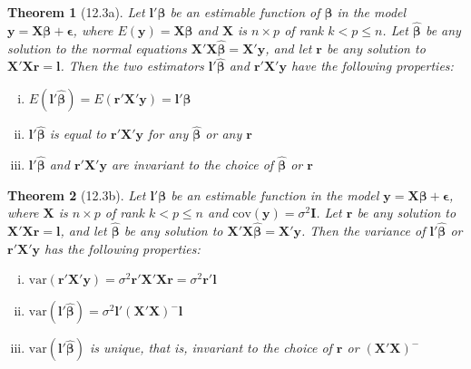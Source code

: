 \documentclass{article}
\newtheorem{theorem}{Theorem}[section]
\begin{document}
\begin{theorem}[12.3a]
Let $\mathbf{l}'\boldsymbol{\beta}$ be an estimable function of $\boldsymbol{\beta}$ in the model $\mathbf{y} = \mathbf{X}\boldsymbol{\beta} + \boldsymbol{\epsilon}$, where $E(\mathbf{y}) = \mathbf{X}\boldsymbol{\beta}$ and $\mathbf{X}$ is $n \times p$ of rank $k < p \leq n$. Let $\hat{\boldsymbol{\beta}}$ be any solution to the normal equations $\mathbf{X}'\mathbf{X}\hat{\boldsymbol{\beta}} = \mathbf{X}'\mathbf{y}$, and let $\mathbf{r}$ be any solution to $\mathbf{X}'\mathbf{X}\mathbf{r} = \mathbf{l}$. Then the two estimators $\mathbf{l}'\hat{\boldsymbol{\beta}}$ and $\mathbf{r}'\mathbf{X}'\mathbf{y}$ have the following properties:

\begin{enumerate}[(i)]
\item $E(\mathbf{l}'\hat{\boldsymbol{\beta}}) = E(\mathbf{r}'\mathbf{X}'\mathbf{y}) = \mathbf{l}'\boldsymbol{\beta}$
\item $\mathbf{l}'\hat{\boldsymbol{\beta}}$ is equal to $\mathbf{r}'\mathbf{X}'\mathbf{y}$ for any $\hat{\boldsymbol{\beta}}$ or any $\mathbf{r}$
\item $\mathbf{l}'\hat{\boldsymbol{\beta}}$ and $\mathbf{r}'\mathbf{X}'\mathbf{y}$ are invariant to the choice of $\hat{\boldsymbol{\beta}}$ or $\mathbf{r}$
\end{enumerate}
\end{theorem}

\begin{theorem}[12.3b]
Let $\mathbf{l}'\boldsymbol{\beta}$ be an estimable function in the model $\mathbf{y} = \mathbf{X}\boldsymbol{\beta} + \boldsymbol{\epsilon}$, where $\mathbf{X}$ is $n \times p$ of rank $k < p \leq n$ and $\text{cov}(\mathbf{y}) = \sigma^2\mathbf{I}$. Let $\mathbf{r}$ be any solution to $\mathbf{X}'\mathbf{X}\mathbf{r} = \mathbf{l}$, and let $\hat{\boldsymbol{\beta}}$ be any solution to $\mathbf{X}'\mathbf{X}\hat{\boldsymbol{\beta}} = \mathbf{X}'\mathbf{y}$. Then the variance of $\mathbf{l}'\hat{\boldsymbol{\beta}}$ or $\mathbf{r}'\mathbf{X}'\mathbf{y}$ has the following properties:

\begin{enumerate}[(i)]
\item $\text{var}(\mathbf{r}'\mathbf{X}'\mathbf{y}) = \sigma^2\mathbf{r}'\mathbf{X}'\mathbf{X}\mathbf{r} = \sigma^2\mathbf{r}'\mathbf{l}$
\item $\text{var}(\mathbf{l}'\hat{\boldsymbol{\beta}}) = \sigma^2\mathbf{l}'(\mathbf{X}'\mathbf{X})^{-}\mathbf{l}$
\item $\text{var}(\mathbf{l}'\hat{\boldsymbol{\beta}})$ is unique, that is, invariant to the choice of $\mathbf{r}$ or $(\mathbf{X}'\mathbf{X})^{-}$
\end{enumerate}
\end{theorem}
\end{document}
